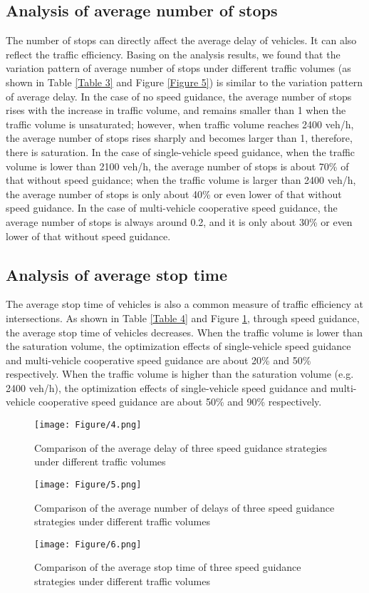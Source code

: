 \documentclass[10.5pt,compsoc]{TsT}
\theoremstyle{mystyle}
\begin{document}
{\subsection{Analysis of average number of stops}
The number of stops can directly affect the average delay of vehicles.
It can also reflect the traffic efficiency. Basing on the analysis
results, we found that the variation pattern of average number of stops
under different traffic volumes (as shown in Table \ref{Table 3} and Figure \ref{Figure 5}) is
similar to the variation pattern of average delay. In the case of no
speed guidance, the average number of stops rises with the increase in
traffic volume, and remains smaller than 1 when the traffic volume is
unsaturated; however, when traffic volume reaches 2400 veh/h, the
average number of stops rises sharply and becomes larger than 1,
therefore, there is saturation. In the case of single-vehicle speed
guidance, when the traffic volume is lower than 2100 veh/h, the average
number of stops is about 70\% of that without speed guidance; when the
traffic volume is larger than 2400 veh/h, the average number of stops is
only about 40\% or even lower of that without speed guidance. In the
case of multi-vehicle cooperative speed guidance, the average number of
stops is always around 0.2, and it is only about 30\% or even lower of
that without speed guidance.

\subsection{Analysis of average stop time}
The average stop time of vehicles is also a common measure of traffic
efficiency at intersections. As shown in Table \ref{Table 4} and Figure \ref{Figure 6}, through
speed guidance, the average stop time of vehicles decreases. When the
traffic volume is lower than the saturation volume, the optimization
effects of single-vehicle speed guidance and multi-vehicle cooperative
speed guidance are about 20\% and 50\% respectively. When the traffic
volume is higher than the saturation volume (e.g. 2400 veh/h), the
optimization effects of single-vehicle speed guidance and multi-vehicle
cooperative speed guidance are about 50\% and 90\% respectively.
\begin{figure}
\centering
\texttt{[image: Figure/4.png]}
\caption{Comparison of the average delay of three speed guidance
strategies under different traffic volumes}
\label{Figure 4}
\vspace{2em}
\texttt{[image: Figure/5.png]}
\caption{Comparison of the average number of delays of three speed
guidance strategies under different traffic volumes}
\label{Figure 5}
\vspace{2em}
\texttt{[image: Figure/6.png]}
\caption{Comparison of the average stop time of three speed guidance
strategies under different traffic volumes}
\label{Figure 6}
\end{figure} 

}
\end{document}
